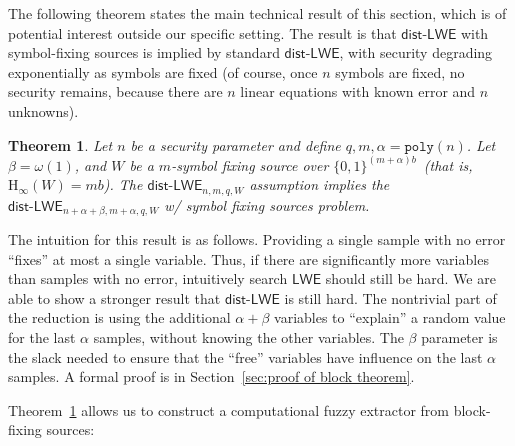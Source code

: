 \documentclass[11pt]{article}
\newcommand{\secref}[1]{\mbox{Section~\ref{#1}}}
\newcommand{\thref}[1]{\mbox{Theorem~\ref{#1}}}
\newcommand{\class}[1]{{\ensuremath{\mathsf{#1}}}}
\newcommand{\zo}{\ensuremath{\{0, 1\}}}
\newcommand{\poly}{\ensuremath{\mathtt{poly}}\xspace}
\newcommand{\Hoo}{\mathrm{H}_\infty}
\newcommand{\LWE}{\class{LWE}}
\newcommand{\distLWE}{\ensuremath{\class{dist\mbox{-}LWE}}}
\newtheorem{theorem}{Theorem}[section]
\newcommand{\authnote}[2]{{\textcolor{red}{\textsf{#1 notes: }\textcolor{blue}{ #2}}\marginpar{\textcolor{red}{\textbf{!!!!!}}}}}
\newcommand{\authnote}[2]{}
\newcommand{\lnote}[1]{{\authnote{Leo}{#1}}}
\begin{document}
The following theorem states the main technical result of this section, which is of potential interest outside our specific setting. The result is that $\distLWE$ with symbol-fixing sources is implied by standard $\distLWE$,  with security degrading exponentially as symbols are fixed (of course, once $n$ symbols are fixed, no security remains, because there are $n$ linear equations with known error and $n$ unknowns).
\begin{theorem}
\label{thm:blockLWE}
Let $n$ be a security parameter and define $q, m , \alpha = \poly(n)$.  Let $\beta  = \omega(1)$, and $W$ be a $m$-symbol fixing source over $\{0,1\}^{(m+\alpha)b}$~(that is, $\Hoo(W) = mb$).  The $\distLWE_{n, m,q, W}$ assumption implies the $\distLWE_{n+\alpha+\beta, m+\alpha, q, W}$ w/ symbol fixing sources problem.
\end{theorem}

The intuition for this result is as follows.  Providing a single sample with no error ``fixes'' at most a single variable.  Thus, if there are significantly more variables than samples with no error, intuitively search $\LWE$ should still be hard.  We are able to show a stronger result that $\distLWE$ is still hard.  The nontrivial part of the reduction is using the additional $\alpha+ \beta$ variables  to ``explain'' a random value for the last $\alpha$ samples, without knowing the other variables.  The $\beta$ parameter is the slack needed to ensure that the ``free'' variables have influence on the last $\alpha$ samples.  A formal proof is in \secref{sec:proof of block theorem}.


\thref{thm:blockLWE} allows us to construct a computational fuzzy extractor from block-fixing sources: 

\end{document}
